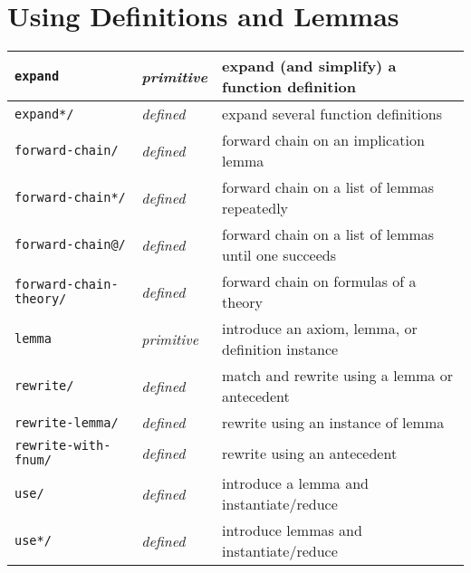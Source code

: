 \documentclass[12pt]{book}
\makeatletter
\newcommand{\indtt}[1]{\texttt{#1}\index{#1@{\texttt{#1}}}}  %
\newcommand{\indttdol}[1]{\texttt{#1/\char36}\index{#1@{\texttt{#1}}}} %
\makeatother
\begin{document}
\section{Using Definitions and Lemmas}

\begin{tabularx}{\textwidth}{|l|l|X|}\hline
\indtt{expand} & \emph{primitive}
  & expand (and simplify) a function definition\\\hline
\indttdol{expand*} & \emph{defined}
  & expand several function definitions\\\hline
\indttdol{forward-chain} & \emph{defined}
  & forward chain on an implication lemma\\\hline
\indttdol{forward-chain*} & \emph{defined}
  & forward chain on a list of lemmas repeatedly\\\hline
\indttdol{forward-chain@} & \emph{defined}
  & forward chain on a list of lemmas until one succeeds \\\hline
\indttdol{forward-chain-theory} & \emph{defined}
  & forward chain on formulas of a theory\\\hline
\indtt{lemma} & \emph{primitive}
  & introduce an axiom, lemma, or definition instance\\\hline
\indttdol{rewrite} & \emph{defined}
  & match and rewrite using a lemma or antecedent \\\hline
\indttdol{rewrite-lemma} & \emph{defined}
  & rewrite using an instance of lemma \\\hline
\indttdol{rewrite-with-fnum} & \emph{defined}
  & rewrite using an antecedent \\\hline
\indttdol{use} & \emph{defined}
  & introduce a lemma and instantiate/reduce \\\hline
\indttdol{use*} & \emph{defined}
  & introduce lemmas and instantiate/reduce \\\hline
\end{tabularx}
\end{document}
